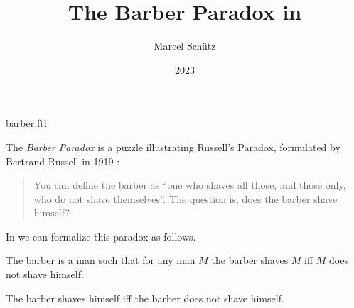 \documentclass{stex}
\begin{document}
\title{The Barber Paradox in \Naproche}
\author{Marcel Schütz}
\date{2023}
\maketitle
\begin{smodule}{barber.ftl}

  \noindent The \emph{Barber Paradox} is a puzzle illustrating Russell's Paradox, formulated by Bertrand Russell in 1919 \cite[p. 355]{Russell1919}:

  \begin{quotation}
    \noindent You can define the barber as “one who shaves all those, and those only, who do not shave themselves”.
    The question is, does the barber shave himself?
  \end{quotation}

  \noindent In \Naproche we can formalize this paradox as follows.

  \begin{forthel}
    \begin{signature*}
      The barber is a man such that for any man $M$ the barber shaves $M$ iff $M$ does not shave himself.
    \end{signature*}

    \begin{theorem*}\label{barber_paradox}
      The barber shaves himself iff the barber does not shave himself.
    \end{theorem*}
  \end{forthel}
\end{smodule}
\printbibliography
\end{document}

